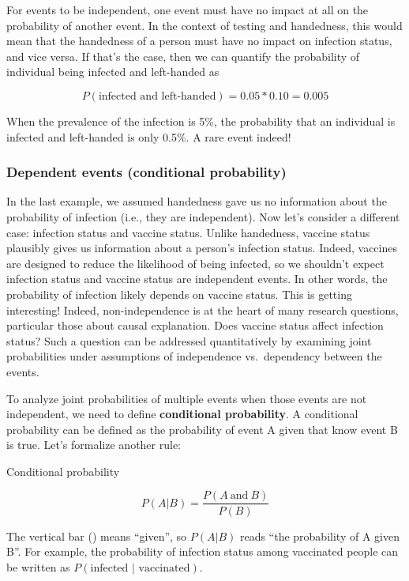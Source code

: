 \documentclass[
]{book}
\begin{document}
For events to be independent, one event must have no impact at all on the probability of another event. In the context of testing and handedness, this would mean that the handedness of a person must have no impact on infection status, and vice versa. If that's the case, then we can quantify the probability of individual being infected and left-handed as

\[
P(\text{infected and left-handed}) = 0.05*0.10=0.005
\]

When the prevalence of the infection is 5\%, the probability that an individual is infected and left-handed is only 0.5\%. A rare event indeed!

\subsubsection{Dependent events (conditional probability)}\label{dependent-events-conditional-probability}

In the last example, we assumed handedness gave us no information about the probability of infection (i.e., they are independent). Now let's consider a different case: infection status and vaccine status. Unlike handedness, vaccine status plausibly gives us information about a person's infection status. Indeed, vaccines are designed to reduce the likelihood of being infected, so we shouldn't expect infection status and vaccine status are independent events. In other words, the probability of infection likely depends on vaccine status. This is getting interesting! Indeed, non-independence is at the heart of many research questions, particular those about causal explanation. Does vaccine status affect infection status? Such a question can be addressed quantitatively by examining joint probabilities under assumptions of independence vs.~dependency between the events.

To analyze joint probabilities of multiple events when those events are not independent, we need to define \textbf{conditional probability}. A conditional probability can be defined as the probability of event A given that know event B is true. Let's formalize another rule:

Conditional probability

\[
P(A|B) = \frac{P(A\ \text{and}\ B)}{P(B)}
\]

The vertical bar (\textbar) means ``given'', so \(P(A|B)\) reads ``the probability of A given B''. For example, the probability of infection status among vaccinated people can be written as \(P(\text{infected | vaccinated})\).
\end{document}
